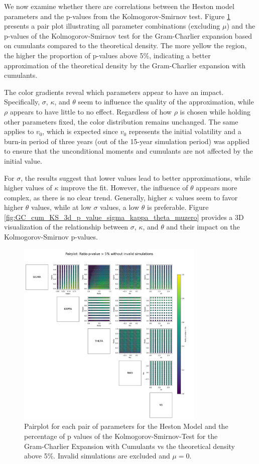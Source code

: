 We now examine whether there are correlations between the Heston model parameters and the p-values from the Kolmogorov-Smirnov test. Figure \ref{fig:pairplot_GC_cum_KS_muzero} presents a pair plot illustrating all parameter combinations (excluding $\mu$) and the p-values of the Kolmogorov-Smirnov test for the Gram-Charlier expansion based on cumulants compared to the theoretical density. The more yellow the region, the higher the proportion of p-values above 5\%, indicating a better approximation of the theoretical density by the Gram-Charlier expansion with cumulants.

The color gradients reveal which parameters appear to have an impact. Specifically, $\sigma$, $\kappa$, and $\theta$ seem to influence the quality of the approximation, while $\rho$ appears to have little to no effect. Regardless of how $\rho$ is chosen while holding other parameters fixed, the color distribution remains unchanged. The same applies to $v_0$, which is expected since $v_0$ represents the initial volatility and a burn-in period of three years (out of the 15-year simulation period) was applied to ensure that the unconditional moments and cumulants are not affected by the initial value.

For $\sigma$, the results suggest that lower values lead to better approximations, while higher values of $\kappa$ improve the fit. However, the influence of $\theta$ appears more complex, as there is no clear trend. Generally, higher $\kappa$ values seem to favor higher $\theta$ values, while at low $\sigma$ values, a low $\theta$ is preferable. Figure \ref{fig:GC_cum_KS_3d_p_value_sigma_kappa_theta_muzero} provides a 3D visualization of the relationship between $\sigma$, $\kappa$, and $\theta$ and their impact on the Kolmogorov-Smirnov p-values.

\begin{figure}
    \centering
    \includegraphics[width=0.8\textwidth]{img/pairplot_GC_cum_KS_muzero.png}
    \caption{Pairplot for each pair of parameters for the Heston Model and the percentage of p values of the Kolmogorov-Smirnov-Test for the Gram-Charlier Expansion with Cumulants vs the theoretical density above 5\%. Invalid simulations are excluded and $\mu=0$.}
    \label{fig:pairplot_GC_cum_KS_muzero}
\end{figure}

